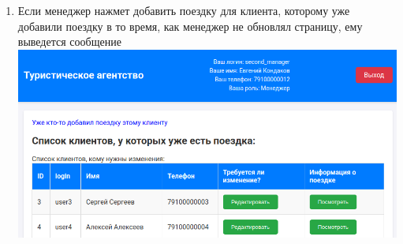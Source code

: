 \documentclass[a4paper,12pt]{article}
\begin{document}
\begin{enumerate}
    \item Если менеджер нажмет добавить поездку для клиента, которому уже добавили поездку в то время, как менеджер не обновлял страницу,
          ему выведется сообщение \\
          \includegraphics[scale=0.5]{media/manager/already_has_trip.png} \\
\end{enumerate}
\end{document}
